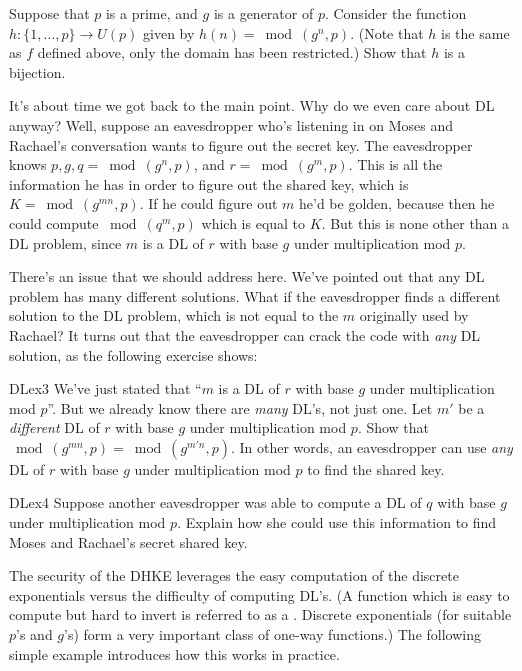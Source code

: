 \begin{exercise}{} 
Suppose that $p$ is a prime, and $g$ is a generator of $p$.  Consider the function $h: \{1,\ldots,p\} \rightarrow U(p)$ given by $h(n) = \bmod(g^n,p)$.  (Note that $h$ is the same as $f$ defined above, only the domain has been restricted.)  Show that $h$ is a bijection.
\end{exercise}

It's about time we got back to the main point. Why do we even care about DL anyway? Well, suppose an eavesdropper who's listening in on Moses and Rachael's conversation wants to figure out the secret key. 
The eavesdropper knows $p, g, q=\bmod(g^n,p)$, and $r=\bmod(g^m,p)$.  This is all the information he has in order to figure out the shared key, which is  $K=\bmod(g^{mn},p)$. If he could figure out $m$ he'd be golden, because then he could compute $\bmod(q^m,p)$ which is equal to $K$. But this is none other than a DL problem, since $m$ is a DL of $r$ with base $g$ under multiplication mod $p$.  

There's an issue that we should address here. We've pointed out that any DL problem has many different solutions. What if the eavesdropper finds a different solution to the DL problem, which is not equal to the $m$ originally used by Rachael? It turns out that the eavesdropper can crack the code with \emph{any} DL solution, as the following exercise shows:

\begin{exercise}{DLex3}
We've just stated that ``$m$ is a DL of $r$ with base $g$ under multiplication mod $p$''.  But we already know there are \emph{many} DL's, not just one. Let $m'$ be a \emph{different} DL of $r$ with base $g$ under multiplication mod $p$. Show that $\bmod(g^{mn},p)=\bmod(g^{m'n},p)$. In other words, an eavesdropper can use \emph{any} DL of $r$ with base $g$ under multiplication mod $p$ to find the shared key.
\end{exercise}

\begin{exercise}{DLex4}
Suppose another eavesdropper was able to compute a DL of $q$ with base $g$ under multiplication mod $p$.  Explain how she could use this information to find Moses and Rachael's secret shared key.
\end{exercise}

The security of the DHKE leverages the easy computation of the discrete exponentials versus the difficulty of computing DL's. (A function which is easy to compute but hard to invert is referred to as a . Discrete exponentials (for suitable $p$'s and $g$'s) form a very important class of one-way functions.)
The following simple example introduces how this works in practice. 

